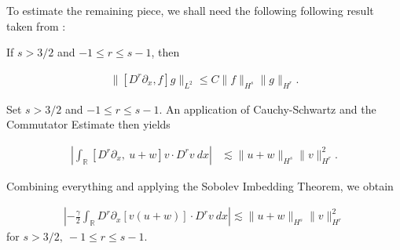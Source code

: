 \documentclass{beamer}
\numberwithin{equation}{section}
\newcommand{\rr}{\mathbb{R}}
\newcommand{\p}{\partial}
\begin{document}
\begin{frame}
To estimate the remaining piece, we shall need the following
following result taken from \cite{Himonas:2010p1187}:

    \begin{lemma}
\label{cor1}
If $s > 3/2$ and $-1 \le r  \le s -1$, then


\begin{equation*}
\begin{split}
\|[D^r \p_x ,f]g\|_{L^2} \le C \|f\|_{H^s} \|g\|_{H^r}.
\label{15}
\end{split}
\end{equation*}


\end{lemma}
\end{frame}

\begin{frame}
Set $s > 3/2$ and $-1 \le r \le s -1$. An application of 
Cauchy-Schwartz and the Commutator Estimate then yields 


\begin{equation*}
\begin{split}
 \left | \int_{\rr} [D^r \p_x, \ u+w] v
\cdot D^r v \ dx \right |
& \lesssim \|u+w\|_{H^s} 
\|v\|_{H^r}^2.
\label{7v}
\end{split}
\end{equation*}


\pause

Combining everything and applying the Sobolev Imbedding 
Theorem, we obtain 


\begin{equation*}
\begin{split}
\left |  -\frac{\gamma}{2} \int_{\rr} D^r \p_x [v(u+w)] \cdot
D^r v \ dx \right |
 \lesssim \|u+w\|_{H^s} \|v\|_{H^r}^2
\label{8v}
\end{split}
\end{equation*}
for $s > 3/2, \ -1 \le r \le s-1$.
\end{frame}
\end{document}
